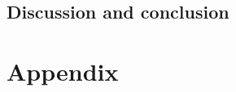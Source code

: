 \chapter{Discussion and conclusion}
%



 




\glsresetall
\appendix %

 \graphicspath{{figures/appendix/}}
\part{Appendix}\label{pt:appendix}
%


